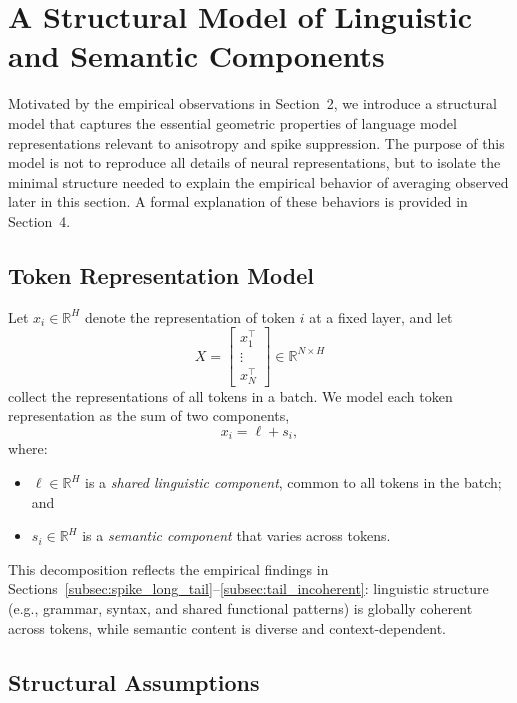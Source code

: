 \section{A Structural Model of Linguistic and Semantic Components}
\label{sec:model}

Motivated by the empirical observations in Section~2, we introduce a structural
model that captures the essential geometric properties of language model
representations relevant to anisotropy and spike suppression.
The purpose of this model is not to reproduce all details of neural
representations, but to isolate the minimal structure needed to explain the
empirical behavior of averaging observed later in this section.
A formal explanation of these behaviors is provided in Section~4.

\subsection{Token Representation Model}
\label{subsec:token_model}

Let $x_i \in \mathbb{R}^H$ denote the representation of token $i$ at a fixed layer,
and let
\[
X = 
\begin{bmatrix}
x_1^\top \\
\vdots \\
x_N^\top
\end{bmatrix}
\in \mathbb{R}^{N \times H}
\]
collect the representations of all tokens in a batch.
We model each token representation as the sum of two components,
\begin{equation}
\label{eq:model_decomposition}
x_i = \ell + s_i,
\end{equation}
where:
\begin{itemize}
  \item $\ell \in \mathbb{R}^H$ is a \emph{shared linguistic component}, common to
  all tokens in the batch; and
  \item $s_i \in \mathbb{R}^H$ is a \emph{semantic component} that varies across
  tokens.
\end{itemize}

This decomposition reflects the empirical findings in
Sections~\ref{subsec:spike_long_tail}--\ref{subsec:tail_incoherent}:
linguistic structure (e.g., grammar, syntax, and shared functional patterns) is
globally coherent across tokens, while semantic content is diverse and
context-dependent.

\subsection{Structural Assumptions}
\label{subsec:structural_assumptions}

